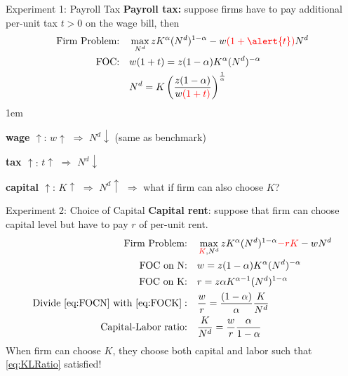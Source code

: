 \documentclass[11pt,aspectratio=43]{beamer} \usepackage[utf8]{inputenc}
\newcommand{\red}[1]{\textcolor{red}{#1}}
\let\olditemize=\itemize
\let\endolditemize=\enditemize
\renewenvironment{itemize}{\olditemize \itemsep1em}{\endolditemize}
\theoremstyle{definition}
\begin{document}
\begin{frame}{Experiment 1: Payroll Tax}
\label{slide:Experiment_1__Payroll_Tax}
    \textbf{Payroll tax:} suppose firms have to pay additional per-unit tax $ t > 0$ on the wage bill, then
    \begin{align}
        \text{Firm Problem:} \quad
            & \max_{N^{d}} z K^{\alpha} ( N^{d} )^{1-\alpha} - w \red{( 1+\alert{t} )} N^{d}
        \\
        \text{FOC:} \quad
            & w( 1+t ) = z ( 1-\alpha ) K^{\alpha} ( N^{d} )^{-\alpha}
        \\
            & N^{d} = K \left(
                \frac{z ( 1-\alpha )}{w \red{( 1+t )}}
            \right)^{\frac{1}{\alpha}}
    \end{align}
    \begin{itemize}
        \item \textbf{wage $ \uparrow  $}: $ w \uparrow  $ $ \Rightarrow  $ $ N^{d} \downarrow  $ (same as benchmark)
        \item \textbf{tax $ \uparrow  $}: $ t \uparrow  $ $ \Rightarrow  $ $ N^{d} \downarrow  $
        \item \textbf{capital $ \uparrow  $}: $ K \uparrow  $ $ \Rightarrow  $ $ N^{d} \uparrow  $ $ \Rightarrow  $ \alert{what if firm can also choose $ K $?}
    \end{itemize}
\end{frame}

\begin{frame}{Experiment 2: Choice of Capital}
\label{slide:Experiment_2__Choice_of_Capital}
    \textbf{Capital rent}: suppose that firm can choose capital level but have to pay $ r $ of per-unit rent.
    \begin{align}
        \text{Firm Problem:} \quad
            & \max_{\red{K}, N^{d}} z K^{\alpha} ( N^{d} )^{1-\alpha} \red{- r K} - w N^{d}
        \\
        \text{FOC on N:} \quad
            & w = z ( 1-\alpha ) K^{\alpha} ( N^{d} )^{-\alpha}
            \label{eq:FOCN}
        \\
        \text{FOC on K:} \quad
            & r = z \alpha K^{\alpha-1} ( N^{d} )^{1-\alpha}
            \label{eq:FOCK}
        \\
        \text{Divide } \eqref{eq:FOCN} \text{ with } \eqref{eq:FOCK}: \quad
            & \frac{w}{r} = \frac{( 1-\alpha )}{\alpha} \frac{K}{N^{d}}
        \\
        \text{Capital-Labor ratio:} \quad
            & \frac{K}{N^{d}} = \frac{w}{r} \frac{\alpha}{1-\alpha}
            \label{eq:KLRatio}
    \end{align}
    When firm can choose $ K $, they choose both capital and labor such that \eqref{eq:KLRatio} satisfied!
\end{frame}
\end{document}
